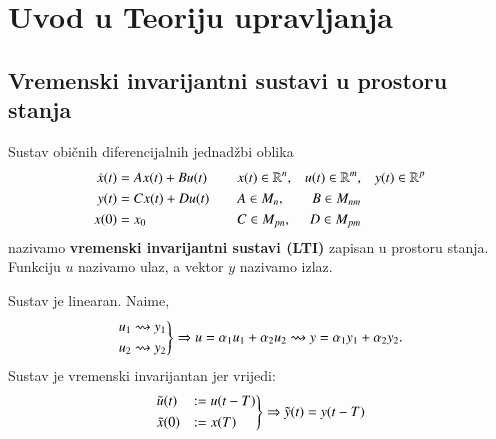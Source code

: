 
\chapter[Uvod u Teoriju upravljanja][UuTU]{Uvod u Teoriju upravljanja}
\section[Vremenski invarijantni sustavi u prostoru stanja][Vremenski invarijantni sustavi u prostoru stanja]{Vremenski invarijantni sustavi u prostoru stanja}
\begin{defn}
    Sustav običnih diferencijalnih jednadžbi oblika
    \begin{equation}
        \begin{aligned}
            \dot{x}(t) & = A x(t) + B u(t)\\
            y(t) & = C x(t) + D u(t)\\
            x(0) &= x_0\\
        \end{aligned}
        \qquad
        \begin{aligned}
            &x(t) \in \mathbb{R}^n, & u(t) \in \mathbb{R}^m,& \quad y(t) \in \mathbb{R}^p\\
            &A \in M_n, & B \in M_{nm}&\\
            &C \in M_{pn}, & D \in M_{pm}&\\
        \end{aligned}
        \label{eq:LTI}
    \end{equation}
    nazivamo \textbf{vremenski invarijantni sustavi (LTI)} zapisan u prostoru stanja.\\
    Funkciju $u$ nazivamo ulaz, a vektor $y$ nazivamo izlaz.
\end{defn}
\begin{rem}
    Sustav je linearan. Naime,
    \begin{equation*}
        \begin{rcases}
            u_1 \rightsquigarrow y_1 \\
            u_2 \rightsquigarrow y_2 
        \end{rcases}
        \Rightarrow
        u = \alpha_1 u_1 + \alpha_2 u_2 \rightsquigarrow y = \alpha_1 y_1 + \alpha_2 y_2.
    \end{equation*}
    Sustav je vremenski invarijantan jer vrijedi: 
    \begin{equation*}
            \begin{rcases}
            \tilde{u}(t) &:= u(t-T)\\
            \tilde{x}(0) &:= x(T) \\ 
        \end{rcases}
        \Rightarrow
        \tilde{y}(t) = y(t-T)
    \end{equation*}
\end{rem}
